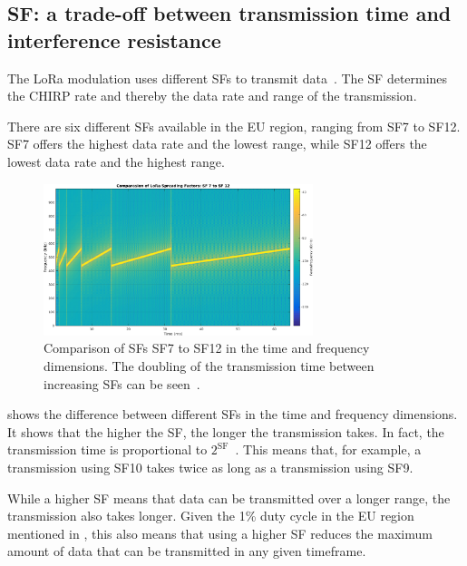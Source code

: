 \subsection{\acl{SF}: a trade-off between transmission time and interference resistance}\label{sec:spreading-factors}

The \ac{LoRa} modulation uses different \aclp{SF} to transmit data~\cite{the_things_network_spreading_2023}.
The \acl{SF} determines the \ac{CHIRP} rate and thereby the data rate and range of the transmission.

There are six different \aclp{SF} available in the \ac{EU} region, ranging from \ac{SF}7 to \ac{SF}12.
\ac{SF}7 offers the highest data rate and the lowest range, while \ac{SF}12 offers the lowest data rate and the highest range.

\begin{figure}[htbp]
    \centering
    \includegraphics[width=0.7\textwidth]{pictures/lora/SF_Comparison_7_12.png}
    \caption[Comparison of \aclp{SF} 7 to 12 in the time and frequency dimensions.]{
        Comparison of \aclp{SF} \ac{SF}7 to \ac{SF}12 in the time and frequency dimensions.
        The doubling of the transmission time between increasing \aclp{SF} can be seen~\protect\cite{sakshama_ghoslya_lora_2017}.
    }\label{pic:lora-sf-comparison}
\end{figure}

 shows the difference between different \aclp{SF} in the time and frequency dimensions.
It shows that the higher the \ac{SF}, the longer the transmission takes.
In fact, the transmission time is proportional to $2^{\text{SF}}$~\cite{sakshama_ghoslya_lora_2017}.
This means that, for example, a transmission using \ac{SF}10 takes twice as long as a transmission using \ac{SF}9.

While a higher \acl{SF} means that data can be transmitted over a longer range, the transmission also takes longer.
Given the 1\% duty cycle in the \ac{EU} region mentioned in , this also means that using a higher \acl{SF} reduces the maximum amount of data that can be transmitted in any given timeframe.

